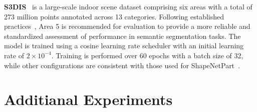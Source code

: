\textbf{S3DIS}~\cite{armeni20163d} is a large-scale indoor scene dataset comprising six areas with a total of 273 million points annotated across 13 categories. Following established practices~\cite{dong2022autoencoders}, Area 5 is recommended for evaluation to provide a more reliable and standardized assessment of performance in semantic segmentation tasks. The model is trained using a cosine learning rate scheduler with an initial learning rate of $2 \times 10^{-4}$. Training is performed over 60 epochs with a batch size of 32, while other configurations are consistent with those used for ShapeNetPart~\cite{yi2016scalable}.


\section{Additianal Experiments}


